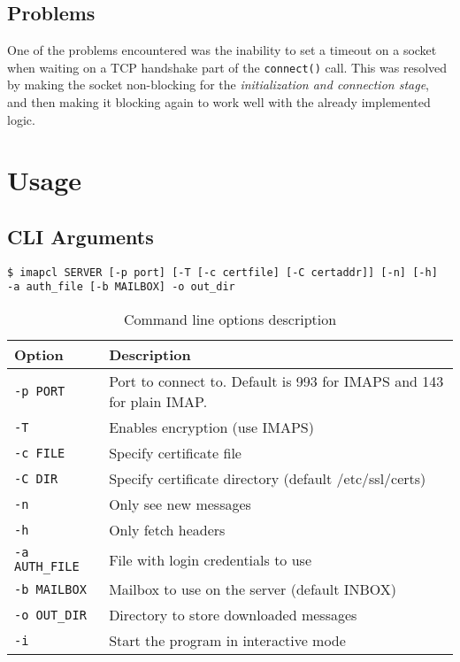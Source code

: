 \documentclass[a4]{report}
\begin{document}
\section{Problems}

One of the problems encountered was the inability to set a timeout on a socket when waiting on a TCP handshake part of the \texttt{connect()} call. This was resolved by making the socket non-blocking for the \textit{initialization and connection stage}, and then making it blocking again to work well with the already implemented logic.\cite{timeout-sof}

\chapter{Usage}


\section{CLI Arguments}

\begin{mdframed}
\begin{verbatim}
$ imapcl SERVER [-p port] [-T [-c certfile] [-C certaddr]] [-n] [-h]
-a auth_file [-b MAILBOX] -o out_dir
\end{verbatim}
\end{mdframed}

\begin{table}[h]
  \renewcommand*{\arraystretch}{1.0}
  \centering
  \begin{tabular}{|l|l|}
    \hline
    \rowcolor{lightgray}
    Option & Description\\
    \hline
    \texttt{-p PORT}      & Port to connect to. Default is 993 for IMAPS and 143 for plain IMAP.\\
    \texttt{-T}          & Enables encryption (use IMAPS)\\
    \texttt{-c FILE}     & Specify certificate file\\
    \texttt{-C DIR}      & Specify certificate directory (default /etc/ssl/certs)\\
    \texttt{-n}          & Only see new messages\\
    \texttt{-h}          & Only fetch headers\\
    \texttt{-a AUTH\_FILE}& File with login credentials to use\\
    \texttt{-b MAILBOX}  & Mailbox to use on the server (default INBOX)\\
    \texttt{-o OUT\_DIR}  & Directory to store downloaded messages\\
    \texttt{-i}          & Start the program in interactive mode\\
    \hline
  \end{tabular}
  \caption{Command line options description}
\end{table}
\end{document}
